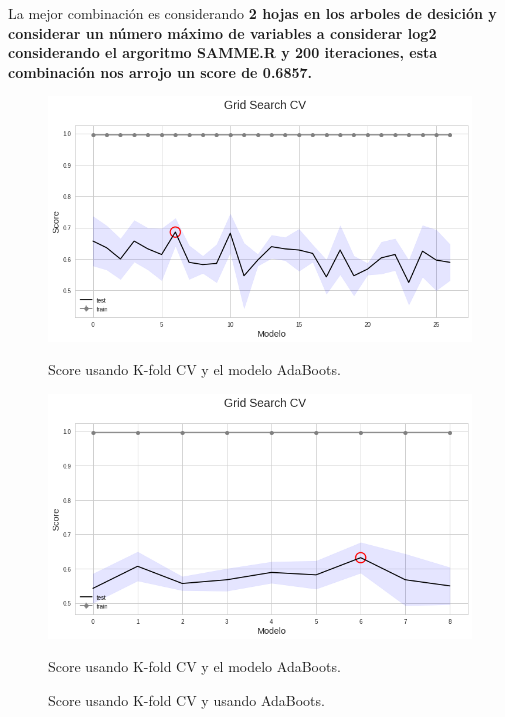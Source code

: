 \documentclass[paper=letter, fontsize=11pt]{scrartcl}
\numberwithin{equation}{section} %
\numberwithin{figure}{section} %
\numberwithin{table}{section} %
\begin{document}
La mejor combinación es considerando\textbf{ 2 hojas en los arboles de desición y considerar un número máximo de variables a considerar log2 considerando el argoritmo SAMME.R y 200 iteraciones, esta combinación nos arrojo un score de 0.6857.}
\begin{figure}[!htb]
 \includegraphics[scale=0.4]{figure/s_ada_pca.png}\caption{Score usando K-fold CV y el modelo AdaBoots.}\label{s_ada_pca}
\endminipage\hfill
{}
  \includegraphics[scale=0.4]{figure/s_ada.png}\caption{Score usando K-fold CV y el modelo AdaBoots.}\label{s_ada}
\endminipage
\caption{Score usando K-fold CV y usando AdaBoots.}\label{s_adas}
\end{figure}
\end{document}
